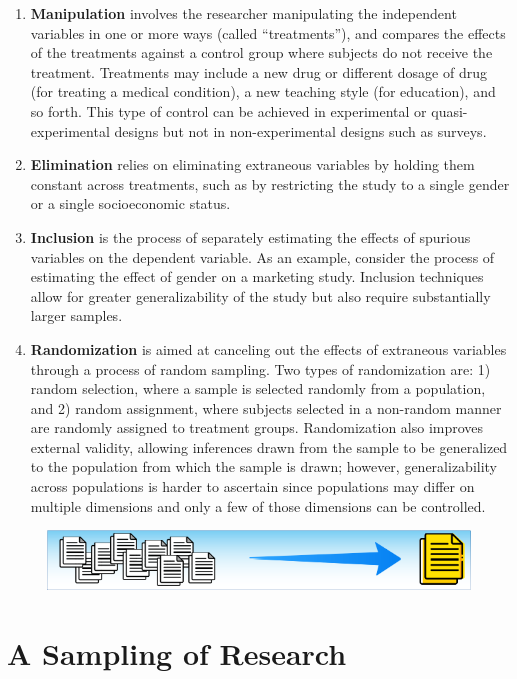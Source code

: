\begin{enumerate}
	\item \textbf{Manipulation} involves the researcher manipulating the independent variables in one or more ways (called ``treatments''), and compares the effects of the treatments against a control group where subjects do not receive the treatment. Treatments may include a new drug or different dosage of drug (for treating a medical condition), a new teaching style (for education), and so forth. This type of control can be achieved in experimental or quasi-experimental designs but not in non-experimental designs such as surveys. 
	
	\item \textbf{Elimination} relies on eliminating extraneous variables by holding them constant across treatments, such as by restricting the study to a single gender or a single socioeconomic status. 
	
	\item \textbf{Inclusion} is the process of separately estimating the effects of spurious variables on the dependent variable. As an example, consider the process of estimating the effect of gender on a marketing study. Inclusion techniques allow for greater generalizability of the study but also require substantially larger samples. 
	
	\item \textbf{Randomization} is aimed at canceling out the effects of extraneous variables through a process of random sampling. Two types of randomization are: 1) random selection, where a sample is selected randomly from a population, and 2) random assignment, where subjects selected in a non-random manner are randomly assigned to treatment groups. Randomization also improves external validity, allowing inferences drawn from the sample to be generalized to the population from which the sample is drawn; however, generalizability across populations is harder to ascertain since populations may differ on multiple dimensions and only a few of those dimensions can be controlled.
	
\end{enumerate}

\noindent\begin{minipage}{\textwidth}
	\begin{figure}[H]
		\centering
		\includegraphics[width=.85\linewidth]{gfx/Sampling_Of_Research}
		\caption*{}
		\label{05:sampling_of_research}
	\end{figure}
	\vspace{-10.0ex} %
	\section{A Sampling of Research}
\end{minipage}
